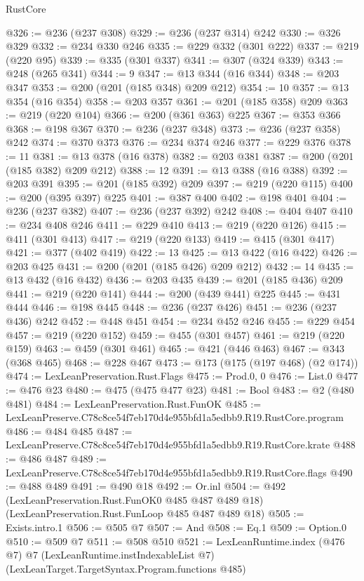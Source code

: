 \begin{lexlean}{RustCore}
\begin{coremodule}
@326 := @236 (@237 @308)
@329 := @236 (@237 @314) @242
@330 := @326 @329
@332 := @234 @330 @246
@335 := @229 @332 (@301 @222)
@337 := @219 (@220 @95)
@339 := @335 (@301 @337)
@341 := @307 (@324 @339)
@343 := @248 (@265 @341)
@344 := 9
@347 := @13 @344 (@16 @344)
@348 := @203 @347
@353 := @200 (@201 (@185 @348) @209 @212)
@354 := 10
@357 := @13 @354 (@16 @354)
@358 := @203 @357
@361 := @201 (@185 @358) @209
@363 := @219 (@220 @104)
@366 := @200 (@361 @363) @225
@367 := @353 @366
@368 := @198 @367
@370 := @236 (@237 @348)
@373 := @236 (@237 @358) @242
@374 := @370 @373
@376 := @234 @374 @246
@377 := @229 @376
@378 := 11
@381 := @13 @378 (@16 @378)
@382 := @203 @381
@387 := @200 (@201 (@185 @382) @209 @212)
@388 := 12
@391 := @13 @388 (@16 @388)
@392 := @203 @391
@395 := @201 (@185 @392) @209
@397 := @219 (@220 @115)
@400 := @200 (@395 @397) @225
@401 := @387 @400
@402 := @198 @401
@404 := @236 (@237 @382)
@407 := @236 (@237 @392) @242
@408 := @404 @407
@410 := @234 @408 @246
@411 := @229 @410
@413 := @219 (@220 @126)
@415 := @411 (@301 @413)
@417 := @219 (@220 @133)
@419 := @415 (@301 @417)
@421 := @377 (@402 @419)
@422 := 13
@425 := @13 @422 (@16 @422)
@426 := @203 @425
@431 := @200 (@201 (@185 @426) @209 @212)
@432 := 14
@435 := @13 @432 (@16 @432)
@436 := @203 @435
@439 := @201 (@185 @436) @209
@441 := @219 (@220 @141)
@444 := @200 (@439 @441) @225
@445 := @431 @444
@446 := @198 @445
@448 := @236 (@237 @426)
@451 := @236 (@237 @436) @242
@452 := @448 @451
@454 := @234 @452 @246
@455 := @229 @454
@457 := @219 (@220 @152)
@459 := @455 (@301 @457)
@461 := @219 (@220 @159)
@463 := @459 (@301 @461)
@465 := @421 (@446 @463)
@467 := @343 (@368 @465)
@468 := @228 @467
@473 := @173 (@175 (@197 @468) (@2 @174))
@474 := LexLeanPreservation.Rust.Flags
@475 := Prod.{0, 0}
@476 := List.{0}
@477 := @476 @23
@480 := @475 (@475 @477 @23)
@481 := Bool
@483 := @2 (@480 @481)
@484 := LexLeanPreservation.Rust.FunOK
@485 := LexLeanPreserve.C78c8ce54f7eb170d4e955bfd1a5edbb9.R19.RustCore.program
@486 := @484 @485
@487 := LexLeanPreserve.C78c8ce54f7eb170d4e955bfd1a5edbb9.R19.RustCore.krate
@488 := @486 @487
@489 := LexLeanPreserve.C78c8ce54f7eb170d4e955bfd1a5edbb9.R19.RustCore.flags
@490 := @488 @489
@491 := @490 @18
@492 := Or.inl
@504 := @492
    (LexLeanPreservation.Rust.FunOK0 @485 @487 @489 @18)
    (LexLeanPreservation.Rust.FunLoop @485 @487 @489 @18)
@505 := Exists.intro.{1}
@506 := @505 @7
@507 := And
@508 := Eq.{1}
@509 := Option.{0}
@510 := @509 @7
@511 := @508 @510
@521 := LexLeanRuntime.index
    (@476 @7)
    @7
    (LexLeanRuntime.instIndexableList @7)
    (LexLeanTarget.TargetSyntax.Program.functions @485)

\end{coremodule}
\end{lexlean}
